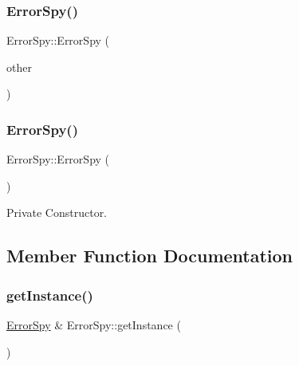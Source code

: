\subsubsection{\texorpdfstring{Error\+Spy()}{ErrorSpy()}\hspace{0.1cm}{\footnotesize\ttfamily [2/3]}}
{\footnotesize\ttfamily Error\+Spy\+::\+Error\+Spy (\begin{DoxyParamCaption}\item[{const \hyperlink{class_error_spy}{Error\+Spy} \&\&}]{other }\end{DoxyParamCaption})\hspace{0.3cm}{\ttfamily [delete]}}

\mbox{\label{class_error_spy_a8d07ccabb00ac3925d94d77e7092bc99}} 
\subsubsection{\texorpdfstring{Error\+Spy()}{ErrorSpy()}\hspace{0.1cm}{\footnotesize\ttfamily [3/3]}}
{\footnotesize\ttfamily Error\+Spy\+::\+Error\+Spy (\begin{DoxyParamCaption}{ }\end{DoxyParamCaption})\hspace{0.3cm}{\ttfamily [private]}}



Private Constructor. 



\subsection{Member Function Documentation}
\mbox{\label{class_error_spy_a154313e18c3c5e8bb8cba494e2eebdfd}} 
\subsubsection{\texorpdfstring{get\+Instance()}{getInstance()}}
{\footnotesize\ttfamily \hyperlink{class_error_spy}{Error\+Spy} \& Error\+Spy\+::get\+Instance (\begin{DoxyParamCaption}{ }\end{DoxyParamCaption})\hspace{0.3cm}{\ttfamily [static]}}



